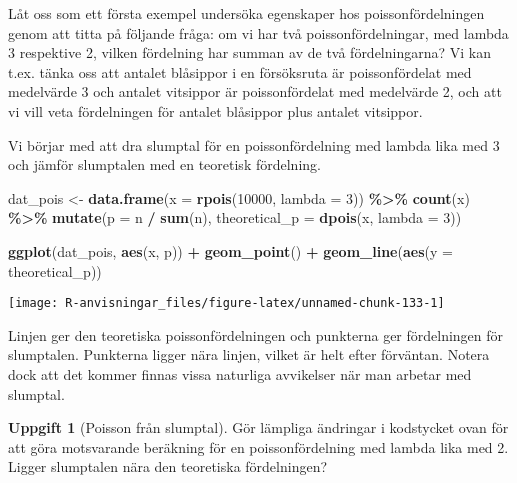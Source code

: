 \documentclass[
]{book}
\newenvironment{Shaded}{\begin{snugshade}}{\end{snugshade}}
\newcommand{\AttributeTok}[1]{\textcolor[rgb]{0.13,0.29,0.53}{#1}}
\newcommand{\DecValTok}[1]{\textcolor[rgb]{0.00,0.00,0.81}{#1}}
\newcommand{\FunctionTok}[1]{\textcolor[rgb]{0.13,0.29,0.53}{\textbf{#1}}}
\newcommand{\NormalTok}[1]{#1}
\newcommand{\OtherTok}[1]{\textcolor[rgb]{0.56,0.35,0.01}{#1}}
\newcommand{\SpecialCharTok}[1]{\textcolor[rgb]{0.81,0.36,0.00}{\textbf{#1}}}
\theoremstyle{definition}
\theoremstyle{definition}
\theoremstyle{definition}
\newtheorem{exercise}{Uppgift}[chapter]
\theoremstyle{definition}
\theoremstyle{remark}
\begin{document}
Låt oss som ett första exempel undersöka egenskaper hos poissonfördelningen genom att titta på följande fråga: om vi har två poissonfördelningar, med lambda 3 respektive 2, vilken fördelning har summan av de två fördelningarna? Vi kan t.ex. tänka oss att antalet blåsippor i en försöksruta är poissonfördelat med medelvärde 3 och antalet vitsippor är poissonfördelat med medelvärde 2, och att vi vill veta fördelningen för antalet blåsippor plus antalet vitsippor.

Vi börjar med att dra slumptal för en poissonfördelning med lambda lika med 3 och jämför slumptalen med en teoretisk fördelning.

\begin{Shaded}
\begin{Highlighting}[]
\NormalTok{dat\_pois }\OtherTok{\textless{}{-}} \FunctionTok{data.frame}\NormalTok{(}\AttributeTok{x =} \FunctionTok{rpois}\NormalTok{(}\DecValTok{10000}\NormalTok{, }\AttributeTok{lambda =} \DecValTok{3}\NormalTok{)) }\SpecialCharTok{\%\textgreater{}\%} 
  \FunctionTok{count}\NormalTok{(x) }\SpecialCharTok{\%\textgreater{}\%} 
  \FunctionTok{mutate}\NormalTok{(}\AttributeTok{p =}\NormalTok{ n }\SpecialCharTok{/} \FunctionTok{sum}\NormalTok{(n),}
         \AttributeTok{theoretical\_p =} \FunctionTok{dpois}\NormalTok{(x, }\AttributeTok{lambda =} \DecValTok{3}\NormalTok{))}

\FunctionTok{ggplot}\NormalTok{(dat\_pois, }\FunctionTok{aes}\NormalTok{(x, p)) }\SpecialCharTok{+}
  \FunctionTok{geom\_point}\NormalTok{() }\SpecialCharTok{+}
  \FunctionTok{geom\_line}\NormalTok{(}\FunctionTok{aes}\NormalTok{(}\AttributeTok{y =}\NormalTok{ theoretical\_p))}
\end{Highlighting}
\end{Shaded}

\begin{center}\texttt{[image: R-anvisningar\_files/figure-latex/unnamed-chunk-133-1]} \end{center}

Linjen ger den teoretiska poissonfördelningen och punkterna ger fördelningen för slumptalen. Punkterna ligger nära linjen, vilket är helt efter förväntan. Notera dock att det kommer finnas vissa naturliga avvikelser när man arbetar med slumptal.

\begin{exercise}[Poisson från slumptal]
Gör lämpliga ändringar i kodstycket ovan för att göra motsvarande beräkning för en poissonfördelning med lambda lika med 2. Ligger slumptalen nära den teoretiska fördelningen?
\end{exercise}
\end{document}
